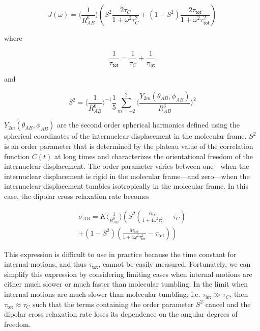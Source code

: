 \documentclass[9pt,review]{livecoms}
\begin{document}
\begin{equation}
\label{eqn:ls_spectral_density}
J(\omega) = \langle \frac {1} {R_{AB}^6} \rangle \left( S^2 \frac {2 \tau_C} {1 + \omega^2 \tau_C^2} + \left( 1 - S^2 \right) \frac {2 \tau_{\mathsf{tot}}} {1 + \omega^2 \tau_{\mathsf{tot}}^2} \right)
\end{equation}

\noindent where

\begin{equation}
\label{eqn:ls_total_tumbling}
\frac {1} {\tau_{\mathsf{tot}}} = \frac {1} {\tau_C} + \frac {1} {\tau_{\mathsf{int}}}
\end{equation}

\noindent and

\begin{equation}
\label{eqn:ls_order_parameter}
S^2 = \langle \frac {1} {R_{AB}^6} \rangle^{-1} \frac {1} {5} \sum_{m=-2}^2 \langle \frac {Y_{2m}(\theta_{AB}, \phi_{AB})} {R_{AB}^3} \rangle^2
\end{equation}

\noindent $Y_{2m}(\theta_{AB}, \phi_{AB})$ are the second order spherical harmonics defined using the spherical coordinates of the internuclear displacement in the molecular frame.
$S^2$ is an order parameter that is determined by the plateau value of the correlation function $C(t)$ at long times and characterizes the orientational freedom of the internuclear displacement.
The order parameter varies between one---when the internuclear displacement is rigid in the molecular frame---and zero---when the internuclear displacement tumbles isotropically in the molecular frame.
In this case, the dipolar cross relaxation rate becomes

\begin{equation}
\label{eqn:ls_cross_relaxation}
\begin{gathered}
\sigma_{AB} = K \langle \frac {1} {R_{AB}^6} \rangle \left( S^2 \left( \frac {6 \tau_C} {1 + 4 \omega^2 \tau_C^2} - \tau_C \right) \right. \\
\left. + (1 - S^2) \left( \frac {6 \tau_{\mathsf{tot}}} {1 + 4 \omega^2 \tau_{\mathsf{tot}}^2} - \tau_{\mathsf{tot}} \right) \right)
\end{gathered}
\end{equation}

This expression is difficult to use in practice because the time constant for internal motions, and thus $\tau_{\mathsf{tot}}$, cannot be easily measured.
Fortunately, we can simplify this expression by considering limiting cases when internal motions are either much slower or much faster than molecular tumbling.
In the limit when internal motions are much slower than molecular tumbling, i.e. $\tau_{\mathsf{int}} \gg \tau_C$, then $\tau_{\mathsf{tot}} \approx \tau_C$ such that the terms containing the order parameter $S^2$ cancel and the dipolar cross relaxation rate loses its dependence on the angular degrees of freedom.
\end{document}
